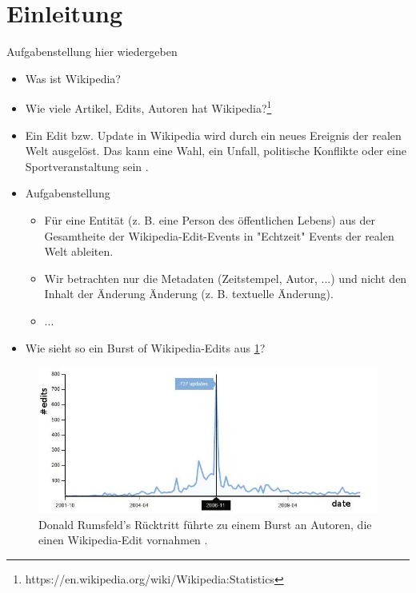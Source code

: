 \section{Einleitung}
Aufgabenstellung hier wiedergeben

\begin{itemize}
    \item Was ist Wikipedia?
    \item Wie viele Artikel, Edits, Autoren hat Wikipedia?\footnote{https://en.wikipedia.org/wiki/Wikipedia:Statistics}
    \item Ein Edit bzw. Update in Wikipedia wird durch ein neues Ereignis der realen Welt ausgelöst. Das kann eine Wahl,
    ein Unfall, politische Konflikte oder eine Sportveranstaltung sein \cite{10.1007978-3-642-36973-5_22}.
    \item Aufgabenstellung
    \begin{itemize}
        \item Für eine Entität (z. B. eine Person des öffentlichen Lebens) aus der Gesamtheite der Wikipedia-Edit-Events in "Echtzeit"
        Events der realen Welt ableiten.
        \item Wir betrachten nur die Metadaten (Zeitstempel, Autor, ...) und nicht den Inhalt der Änderung Änderung (z. B. textuelle Änderung).
        \item ...
    \end{itemize}
    \item Wie sieht so ein Burst of Wikipedia-Edits aus \ref{fig:donald_rumsfelds_resignation_burst}?
\end{itemize}


\begin{figure}[h]
    \includegraphics[width=.5\textwidth]{images/Extracting_EventRelated_Information_from_Article.jpg}
    \caption{Donald Rumsfeld’s Rücktritt führte zu einem Burst an Autoren, die einen Wikipedia-Edit vornahmen \cite{10.1007978-3-642-36973-5_22}.}
    \label{fig:donald_rumsfelds_resignation_burst}
\end{figure}